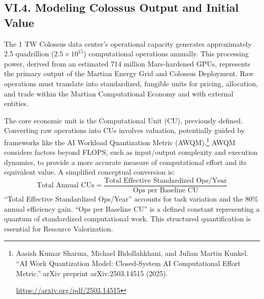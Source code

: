 \documentclass[fontsize=10pt, oneside, DIV=calc]{scrartcl}
\begin{document}
\subsection*{VI.4. Modeling Colossus Output and Initial Value}



\medskip

\noindent
The 1 TW Colossus data center's operational capacity generates approximately 2.5 quadrillion ($2.5 \times 10^{15}$) computational operations annually. This processing power, derived from an estimated 714 million Mars-hardened GPUs, represents the primary output of the Martian Energy Grid and Colossus Deployment. Raw operations must translate into standardized, fungible units for pricing, allocation, and trade within the Martian Computational Economy and with external entities.

\medskip

\noindent
The core economic unit is the Computational Unit (CU), previously defined. Converting raw operations into CUs involves valuation, potentially guided by frameworks like the AI Workload Quantization Metric (AWQM).\footnote{Aasish Kumar Sharma, Michael Bidollahkhani, and Julian Martin Kunkel. ``AI Work Quantization Model: Closed-System AI Computational Effort Metric.'' arXiv preprint arXiv:2503.14515 (2025). 







\href{https://arxiv.org/pdf/2503.14515}\url{https://arxiv.org/pdf/2503.14515}} AWQM considers factors beyond FLOPS, such as input/output complexity and execution dynamics, to provide a more accurate measure of computational effort and its equivalent value. A simplified conceptual conversion is:
\begin{equation}
\text{Total Annual CUs} = \frac{\text{Total Effective Standardized Ops/Year}}{\text{Ops per Baseline CU}}
\end{equation}
``Total Effective Standardized Ops/Year'' accounts for task variation and the 80\% annual efficiency gain. ``Ops per Baseline CU'' is a defined constant representing a quantum of standardized computational work. This structured quantification is essential for Resource Valorization.

\medskip
\end{document}
